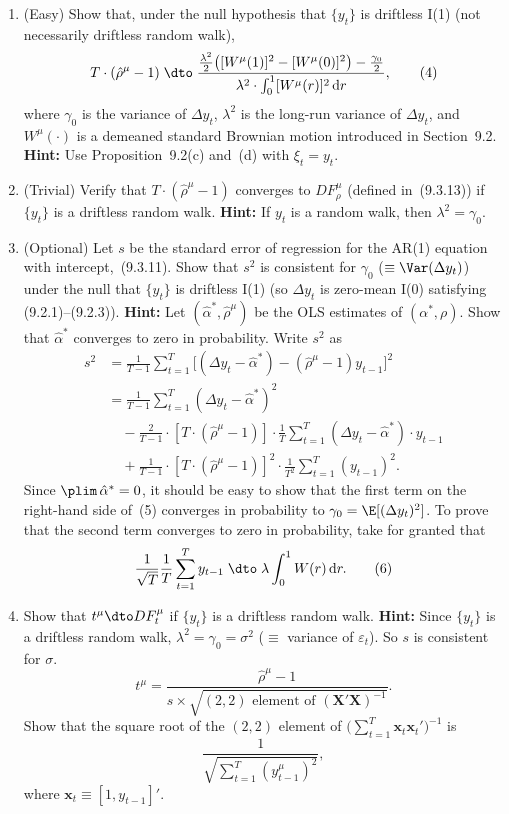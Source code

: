 \begin{problemset}
\begin{enumerate}[label=(\alph*)]
\item (Easy) \enspace Show that, under the null hypothesis that $\{y_t\}$ is driftless I(1) (not
necessarily driftless random walk),
\[
T \cdot (\hat{\rho}^\mu - 1)
\;\dto\;
\frac{\frac{\lambda^2}{2}\big([W^\mu(1)]^2 - [W^\mu(0)]^2\big) - \frac{\gamma_0}{2}}{\lambda^2 \cdot \int_0^1 [W^\mu(r)]^2\,\mathrm{d}r},
\tag{4}
\]
where $\gamma_0$ is the variance of $\Delta y_t$, $\lambda^2$ is the long-run variance of $\Delta y_t$, and
$W^\mu(\cdot)$ is a demeaned standard Brownian motion introduced in Section~9.2.
\textbf{Hint:} Use Proposition~9.2(c) and~(d) with $\xi_t = y_t$.

\item (Trivial) \enspace Verify that $T \cdot (\hat{\rho}^\mu - 1)$ converges to $DF_\rho^\mu$ (defined in~(9.3.13)) if
$\{y_t\}$ is a driftless random walk. \textbf{Hint:} If $y_t$ is a random walk, then $\lambda^2 = \gamma_0$.

\item (Optional) \enspace Let $s$ be the standard error of regression for the AR(1) equation
with intercept,~(9.3.11). Show that $s^2$ is consistent for $\gamma_0$ ($\equiv \Var(\Delta y_t)$)
under the null that $\{y_t\}$ is driftless I(1) (so $\Delta y_t$ is zero-mean I(0) satisfying
(9.2.1)--(9.2.3)). \textbf{Hint:} Let $(\hat{\alpha}^*, \hat{\rho}^\mu)$ be the OLS estimates of $(\alpha^*, \rho)$. Show
that $\hat{\alpha}^*$ converges to zero in probability. Write $s^2$ as
\begin{align*}
s^2 &= \frac{1}{T-1}\sum_{t=1}^{T}
\bigl[(\Delta y_t - \hat{\alpha}^*) - (\hat{\rho}^\mu - 1)y_{t-1}\bigr]^2 \\
&= \frac{1}{T-1}\sum_{t=1}^{T}(\Delta y_t - \hat{\alpha}^*)^2 \\
&\quad - \frac{2}{T-1}\cdot [T \cdot (\hat{\rho}^\mu - 1)] \cdot
\frac{1}{T}\sum_{t=1}^{T}(\Delta y_t - \hat{\alpha}^*) \cdot y_{t-1} \\
&\quad + \frac{1}{T-1}\cdot [T \cdot (\hat{\rho}^\mu - 1)]^2 \cdot
\frac{1}{T^2}\sum_{t=1}^{T}(y_{t-1})^2.
\tag{5}
\end{align*}
Since $\plim\,\hat{\alpha}^* = 0$, it should be easy to show that the first term on the right-hand side of~(5) converges in probability to $\gamma_0 = \E[(\Delta y_t)^2]$. To prove that
the second term converges to zero in probability, take for granted that
\[
\frac{1}{\sqrt{T}}\frac{1}{T}\sum_{t=1}^{T}y_{t-1}
\;\dto\; \lambda \int_0^1 W(r)\,\mathrm{d}r.
\tag{6}
\]

\item Show that $t^\mu \dto DF_t^\mu$ if $\{y_t\}$ is a driftless random walk. \textbf{Hint:} Since
$\{y_t\}$ is a driftless random walk, $\lambda^2 = \gamma_0 = \sigma^2$ ($\equiv$ variance of $\varepsilon_t$). So $s$ is
consistent for $\sigma$.
\[
t^\mu = \frac{\hat{\rho}^\mu - 1}{s \times \sqrt{(2,2) \text{ element of } (\mathbf{X}'\mathbf{X})^{-1}}}.
\tag{7}
\]
Show that the square root of the $(2, 2)$ element of $\bigl(\sum_{t=1}^{T}\mathbf{x}_t\mathbf{x}_t'\bigr)^{-1}$ is
\[
\frac{1}{\sqrt{\sum_{t=1}^{T}(y_{t-1}^\mu)^2}},
\]
where $\mathbf{x}_t \equiv [1, y_{t-1}]'$.
\end{enumerate}


\end{problemset}

